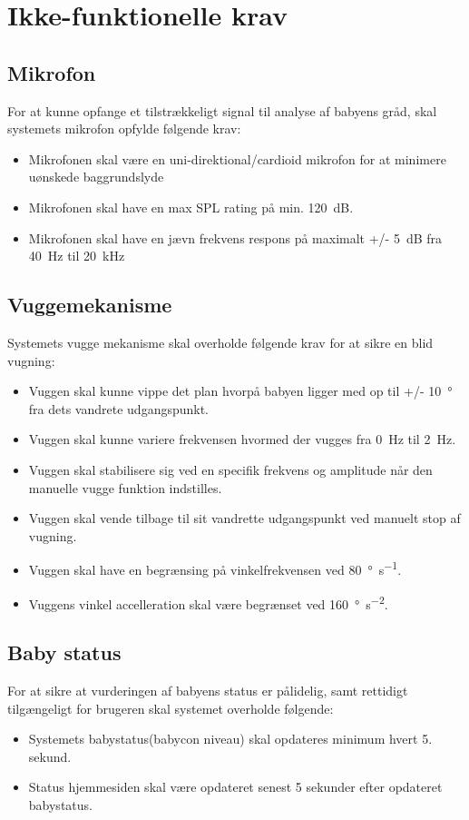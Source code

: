 \section{Ikke-funktionelle krav}


\subsection*{Mikrofon}
For at kunne opfange et tilstrækkeligt signal til analyse af babyens gråd, skal systemets mikrofon opfylde følgende krav:
\begin{itemize}
\item Mikrofonen skal være en uni-direktional/cardioid mikrofon for at minimere uønskede baggrundslyde
\item Mikrofonen skal have en max SPL rating på min. \SI{120}{\dB}.
\item Mikrofonen skal have en jævn frekvens respons på maximalt +/- \SI{5}{\dB} fra \SI{40}{\hertz} til \SI{20}{\kilo\hertz}
\end{itemize}

\subsection*{Vuggemekanisme}

Systemets vugge mekanisme skal overholde følgende krav for at sikre en blid vugning:
\begin{itemize}
\item Vuggen skal kunne vippe det plan hvorpå babyen ligger med op til +/- \SI{10}{\degree} fra dets vandrete udgangspunkt.
\item Vuggen skal kunne variere frekvensen hvormed der vugges fra \SI{0}{\hertz} til \SI{2}{\hertz}.
\item Vuggen skal stabilisere sig ved en specifik frekvens og amplitude når den manuelle vugge funktion indstilles.
\item Vuggen skal vende tilbage til sit vandrette udgangspunkt ved manuelt stop af vugning.
\item Vuggen skal have en begrænsing på vinkelfrekvensen ved \SI{80}{\degree\per\second}.
\item Vuggens vinkel accelleration skal være begrænset ved \SI{160}{\degree\per\square\second}.
\end{itemize}

\subsection*{Baby status}
For at sikre at vurderingen af babyens status er pålidelig, samt rettidigt tilgængeligt for brugeren skal systemet overholde følgende:
\begin{itemize}
\item Systemets babystatus(babycon niveau) skal opdateres minimum hvert 5. sekund.
\item Status hjemmesiden skal være opdateret senest 5 sekunder efter opdateret babystatus.
\end{itemize}
